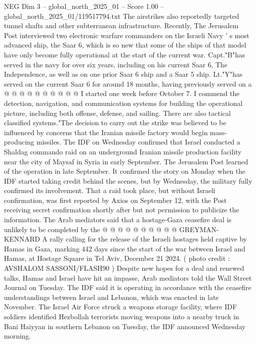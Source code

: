 \begin{textsample}{NEG Dim 3 – global\_north\_2025\_01 – Score 1.00 – global\_north\_2025\_01/119517794.txt}
The airstrikes also reportedly targeted tunnel shafts and other subterranean infrastructure.
Recently, The Jerusalem Post interviewed two electronic warfare commanders on the Israeli Navy ' s most advanced ship, the Saar 6, which is so new that some of the ships of that model have only become fully operational at the start of the current war.
Capt."B"has served in the navy for over six years, including on his current Saar 6, The Independence, as well as on one prior Saar 6 ship and a Saar 5 ship.
Lt."Y"has served on the current Saar 6 for around 18 months, having previously served on a @ @ @ @ @ @ @ @ @ @ I started one week before October 7.
I commend the detection, navigation, and communication systems for building the operational picture, including both offense, defense, and sailing.
There are also tactical classified systems."The decision to carry out the strike was believed to be influenced by concerns that the Iranian missile factory would begin mass-producing missiles.
The IDF on Wednesday confirmed that Israel conducted a Shaldag commando raid on an underground Iranian missile production facility near the city of Maysaf in Syria in early September.
The Jerusalem Post learned of the operation in late September.
It confirmed the story on Monday when the IDF started taking credit behind the scenes, but by Wednesday, the military fully confirmed its involvement.
That a raid took place, but without Israeli confirmation, was first reported by Axios on September 12, with the Post receiving secret confirmation shortly after but not permission to publicize the information.
The Arab mediators said that a hostage-Gaza ceasefire deal is unlikely to be completed by the @ @ @ @ @ @ @ @ @ @ GREYMAN-KENNARD A rally calling for the release of the Israeli hostages held captive by Hamas in Gaza, marking 442 days since the start of the war between Israel and Hamas, at Hostage Square in Tel Aviv, December 21 2024. ( photo credit : AVSHALOM SASSONI/FLASH90 ) Despite new hopes for a deal and renewed talks, Hamas and Israel have hit an impasse, Arab mediators told the Wall Street Journal on Tuesday.
The IDF said it is operating in accordance with the ceasefire understandings between Israel and Lebanon, which was enacted in late November.
The Israel Air Force struck a weapons storage facility, where IDF soldiers identified Hezbollah terrorists moving weapons into a nearby truck in Bani Haiyyan in southern Lebanon on Tuesday, the IDF announced Wednesday morning.

\end{textsample}
